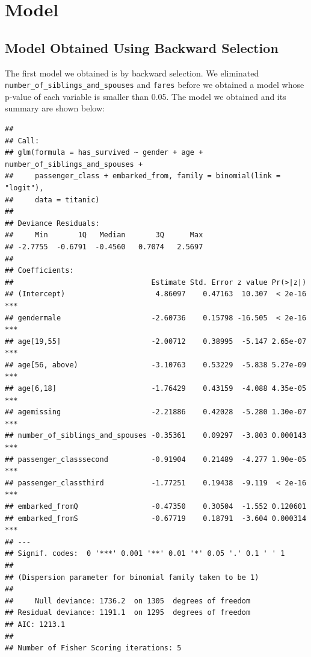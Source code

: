 \documentclass[12pt, oneside]{book}
\theoremstyle{definition}
\theoremstyle{definition}
\theoremstyle{definition}
\theoremstyle{remark}
\begin{document}
\hypertarget{model}{%
\chapter{Model}\label{model}}

\hypertarget{model-obtained-using-backward-selection}{%
\section{Model Obtained Using Backward
Selection}\label{model-obtained-using-backward-selection}}

The first model we obtained is by backward selection. We eliminated
\texttt{number\_of\_siblings\_and\_spouses} and \texttt{fares} before we
obtained a model whose p-value of each variable is smaller than 0.05.
The model we obtained and its summary are shown below:

\begin{verbatim}
## 
## Call:
## glm(formula = has_survived ~ gender + age + number_of_siblings_and_spouses + 
##     passenger_class + embarked_from, family = binomial(link = "logit"), 
##     data = titanic)
## 
## Deviance Residuals: 
##     Min       1Q   Median       3Q      Max  
## -2.7755  -0.6791  -0.4560   0.7074   2.5697  
## 
## Coefficients:
##                                Estimate Std. Error z value Pr(>|z|)    
## (Intercept)                     4.86097    0.47163  10.307  < 2e-16 ***
## gendermale                     -2.60736    0.15798 -16.505  < 2e-16 ***
## age[19,55]                     -2.00712    0.38995  -5.147 2.65e-07 ***
## age[56, above)                 -3.10763    0.53229  -5.838 5.27e-09 ***
## age[6,18]                      -1.76429    0.43159  -4.088 4.35e-05 ***
## agemissing                     -2.21886    0.42028  -5.280 1.30e-07 ***
## number_of_siblings_and_spouses -0.35361    0.09297  -3.803 0.000143 ***
## passenger_classsecond          -0.91904    0.21489  -4.277 1.90e-05 ***
## passenger_classthird           -1.77251    0.19438  -9.119  < 2e-16 ***
## embarked_fromQ                 -0.47350    0.30504  -1.552 0.120601    
## embarked_fromS                 -0.67719    0.18791  -3.604 0.000314 ***
## ---
## Signif. codes:  0 '***' 0.001 '**' 0.01 '*' 0.05 '.' 0.1 ' ' 1
## 
## (Dispersion parameter for binomial family taken to be 1)
## 
##     Null deviance: 1736.2  on 1305  degrees of freedom
## Residual deviance: 1191.1  on 1295  degrees of freedom
## AIC: 1213.1
## 
## Number of Fisher Scoring iterations: 5
\end{verbatim}
\end{document}
